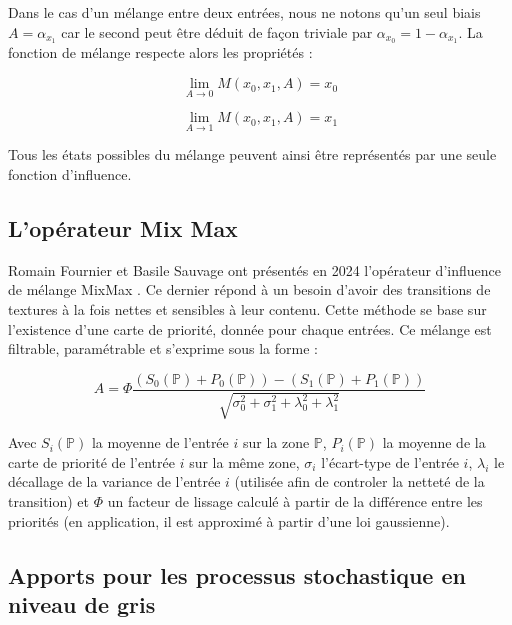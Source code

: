 \documentclass[9pt, twocolumn]{article} %
\begin{document}
Dans le cas d'un mélange entre deux entrées, nous ne notons qu'un seul biais $A
  = \alpha_{x_1}$ car le second peut être déduit de façon triviale par
$\alpha_{x_0} = 1 - \alpha_{x_1}$. La fonction de mélange respecte alors les
propriétés :

\begin{equation}\label{Alpha2WayLim10}
  \lim_{A \rightarrow 0} M(x_0, x_1, A) = x_0
\end{equation}

\begin{equation}\label{Alpha2WayLim1}
  \lim_{A \rightarrow 1} M(x_0, x_1, A) = x_1
\end{equation}

Tous les états possibles du mélange peuvent ainsi être représentés par une
seule fonction d'influence.

\subsection{L'opérateur Mix Max}

Romain Fournier et Basile Sauvage ont présentés en 2024 l'opérateur d'influence
de mélange MixMax \cite{mixmax}. Ce dernier répond à un besoin d'avoir des
transitions de textures à la fois nettes et sensibles à leur contenu. Cette
méthode se base sur l'existence d'une carte de priorité, donnée pour chaque
entrées. Ce mélange est filtrable, paramétrable et s'exprime sous la forme :

\begin{equation}\label{MixMax2024}
  A = \Phi
  \frac{
    (S_0(\mathbb{P}) + P_0(\mathbb{P})) - (S_1(\mathbb{P}) + P_1(\mathbb{P}))
  }{
    \sqrt{\sigma^2_0 + \sigma^2_1 + \lambda^2_0 + \lambda^2_1}
  }
\end{equation}

Avec $S_i(\mathbb{P})$ la moyenne de l'entrée $i$ sur la zone $\mathbb{P}$,
$P_i(\mathbb{P})$ la moyenne de la carte de priorité de l'entrée $i$ sur la
même zone, $\sigma_i$ l'écart-type de l'entrée $i$, $\lambda_i$ le décallage de
la variance de l'entrée $i$ (utilisée afin de controler la netteté de la
transition) et $\Phi$ un facteur de lissage calculé à partir de la différence
entre les priorités (en application, il est approximé à partir d'une loi
gaussienne).

\subsection{Apports pour les processus stochastique en niveau de gris}
\end{document}
